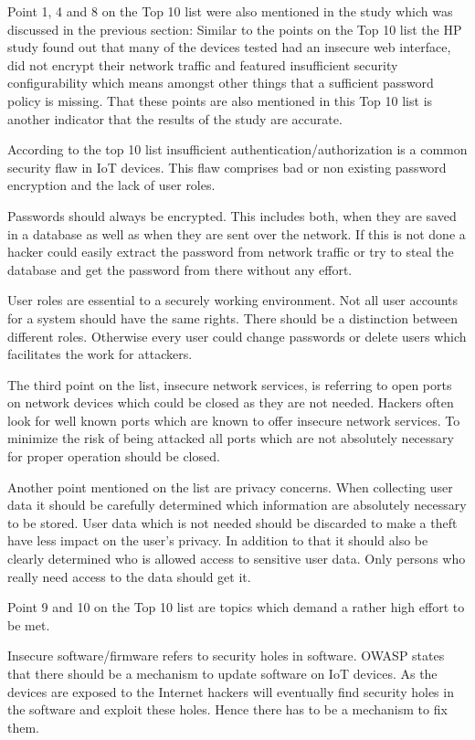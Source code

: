 \documentclass[conference]{IEEEtran}
\begin{document}
Point 1, 4 and 8 on the Top 10 list were also mentioned in the study which 
was discussed in the previous section: Similar to the points on the Top 10 list 
the HP study found out that many of the devices tested had an insecure web 
interface, did not encrypt their network traffic and featured insufficient 
security configurability which means amongst other things that a sufficient 
password policy is missing. That these points are also mentioned in this Top 
10 list is another indicator that the results of the study are accurate.

According to the top 10 list insufficient authentication/authorization is a 
common security flaw in IoT devices. This flaw comprises bad or non existing 
password encryption and the lack of user roles. 

Passwords should always be encrypted. This includes both, when they are saved 
in a database as well as when they are sent over the network. If this is not 
done a hacker could easily extract the password from network traffic or try to 
steal the database and get the password from there without any effort. 

User roles are essential to a securely working environment. Not all user 
accounts for a system should have the same rights. There should be a 
distinction between different roles. Otherwise every user could change 
passwords or delete users which facilitates the work for attackers.

The third point on the list, insecure network services, is referring to open 
ports on network devices which could be closed as they are not needed. Hackers 
often look for well known ports which are known to offer insecure network 
services. To minimize the risk of being attacked all ports which are not 
absolutely necessary for proper operation should be closed.

Another point mentioned on the list are privacy concerns. When collecting user 
data it should be carefully determined which information are absolutely 
necessary to be stored. User data which is not needed should be discarded to 
make a theft have less impact on the user's privacy. In addition to that it 
should also be clearly determined who is allowed access to sensitive user data. 
Only persons who really need access to the data should get it.

Point 9 and 10 on the Top 10 list are topics which demand a rather high effort 
to be met.

Insecure software/firmware refers to security holes in software. OWASP states 
that there should be a mechanism to update software on IoT devices. As the 
devices are exposed to the Internet hackers will eventually find security holes 
in the software and exploit these holes. Hence there has to be a mechanism to 
fix them.
\end{document}
